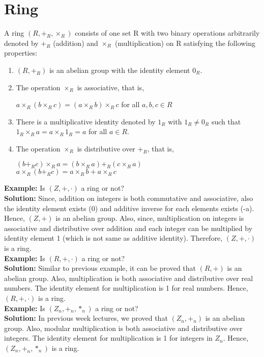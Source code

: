 \documentclass[11pt]{article}
\begin{document}
\section{Ring}
A ring $(R, +_R, \times_R)$ consists of one set R with two binary operations arbitrarily denoted by $+_R$ (addition) and $\times_R$ (multiplication) on R satisfying the following properties:
\begin{enumerate}
    \item $(R, +_R)$ is an abelian group with the identity element $0_R$.
    \item The operation $\times_R$ is associative, that is, 
    \begin{center}
        $a \times_R (b \times_R c) = (a \times_R b) \times_R c$ for all $a, b, c \in R$
    \end{center}
    \item There is a multiplicative identity denoted by $1_R$ with $1_R \neq 0_R$ such that $1_R \times_R a = a \times_R 1_R = a$ for all $a \in R$.
    \item The operation $\times_R$ is distributive over $+_R$, that is,
    \begin{center}
        $(b +_R c) \times_R a = (b \times_R a) +_R (c \times_R a)$\\
        $a \times_R (b +_R c) = a \times_R b + a \times_R c$
    \end{center}
\end{enumerate}

\textbf{Example:} Is $(Z, +, \cdot)$ a ring or not?\\
\textbf{Solution:} Since, addition on integers is both commutative and associative, also the identity element exists (0) and additive inverse for each elements exists (-a). Hence, $(Z, +)$ is an abelian group. Also, since, multiplication on integers is associative and distributive over addition and each integer can be multiplied by identity element 1 (which is not same as additive identity). Therefore, $(Z, +, \cdot)$ is a ring.\\

\textbf{Example:} Is $(R, +, \cdot)$ a ring or not?\\
\textbf{Solution:} Similar to previous example, it can be proved that $(R, +)$ is an abelian group. Also, multiplication is both associative and distributive over real numbers. The identity element for multiplication is 1 for real numbers. Hence, $(R, +, \cdot)$ is a ring.\\

\textbf{Example:} Is $(Z_n, +_n, *_n)$ a ring or not?\\
\textbf{Solution:} In previous week lectures, we proved that $(Z_n, +_n)$ is an abelian group. Also, modular multiplication is both associative and distributive over integers. The identity element for multiplication is 1 for integers in $Z_n$. Hence, $(Z_n, +_n, *_n)$ is a ring.\\
\end{document}
